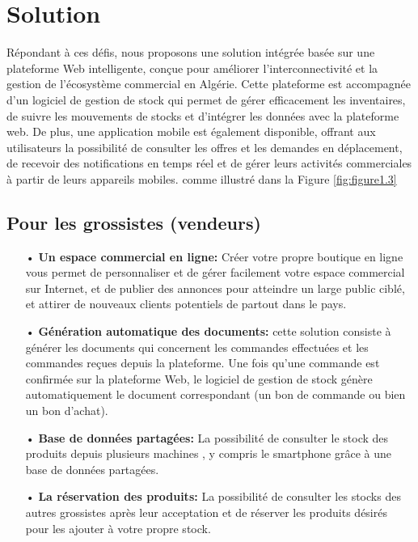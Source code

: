 \documentclass[edit,12pt,a4paper,ChapStyle,oneside,doubleinterligne]{report}
\begin{document}
\section{Solution}

Répondant à ces défis, nous proposons une solution intégrée basée sur une plateforme Web intelligente, conçue pour améliorer l'interconnectivité et la gestion de l'écosystème commercial en Algérie. Cette plateforme est accompagnée d'un logiciel de gestion de stock qui permet de gérer efficacement les inventaires, de suivre les mouvements de stocks et d'intégrer les données avec la plateforme web. De plus, une application mobile est également disponible, offrant aux utilisateurs la possibilité de consulter les offres et les demandes en déplacement, de recevoir des notifications en temps réel et de gérer leurs activités commerciales à partir de leurs appareils mobiles.
comme illustré dans la Figure \ref{fig:figure1.3}
\subsection{Pour les grossistes (vendeurs)}
\begin{itemize}
    \item [•] \textbf{Un espace commercial en ligne: }Créer votre propre boutique en ligne vous permet de personnaliser et de gérer facilement votre espace commercial sur Internet, et de publier des annonces pour atteindre un large public ciblé, et attirer de nouveaux clients potentiels de partout dans le pays.
    \item [•] \textbf{Génération automatique des documents: }cette solution consiste à générer les documents qui concernent les commandes effectuées et les commandes reçues depuis la plateforme. Une fois qu'une commande est confirmée sur la plateforme Web, le logiciel de gestion de stock génère automatiquement le document correspondant (un bon de commande ou bien un bon d’achat).
    \item [•] \textbf{Base de données partagées: }La possibilité de consulter le stock des produits depuis plusieurs machines ,  y compris le smartphone grâce à une base de données partagées.
    \item [•] \textbf{La réservation des produits: }La possibilité de consulter les stocks des autres grossistes après leur acceptation et de réserver les produits désirés pour les ajouter à votre propre stock.
\end{itemize}
\end{document}
